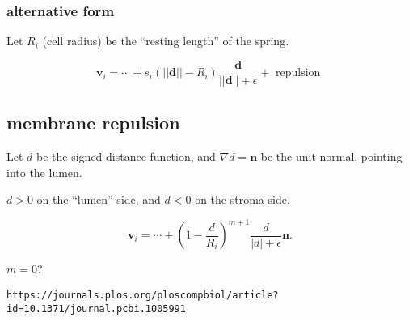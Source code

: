 \documentclass[11point]{article}
\renewcommand{\vec}[1]{\mathbf{#1}}
\newcommand{\norm}[1]{ \left|\left|\mathbf{#1} \right|\right|}
\newcommand{\abs}[1]{\left|#1\right|}
\begin{document}
\subsubsection{alternative form}
Let $R_i$ (cell radius) be the ``resting length'' of the spring. 

$$
\vec{v}_i = \cdots + s_i \left(  \norm{d}  - R_i \right) \frac{ \vec{d}}{\norm{d}+\epsilon} 
+ \textrm{ repulsion } 
$$

\subsection{ membrane repulsion} 
Let $d$ be the signed distance function, and $\nabla{ d} = \vec{n}$ be the unit normal, pointing into the lumen. 

$d > 0$ on the ``lumen'' side, and $d < 0$ on the stroma side. 

$$\vec{v}_i = \cdots + \left(  1 - \frac{ d}{R_i } \right)^{m+1} \frac{d}{\abs{d}+\epsilon} \vec{n}.$$

$m =0$? 


\verb|https://journals.plos.org/ploscompbiol/article?id=10.1371/journal.pcbi.1005991|
\end{document}
